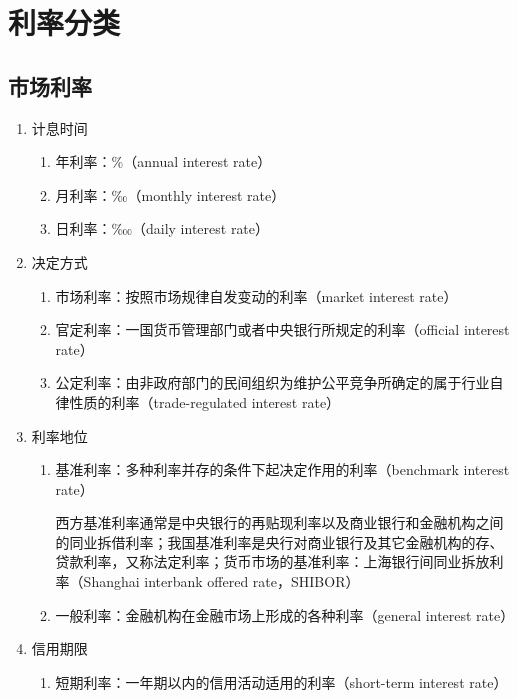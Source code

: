 \documentclass[12pt]{book}
\begin{document}
\section{利率分类}



\subsection{市场利率}


\begin{enumerate}[1.]
    \item 计息时间
          \begin{enumerate}[(1)]
              \item 年利率：\%（annual interest rate）
              \item 月利率：‰（monthly interest rate）
              \item 日利率：‱（daily interest rate）
          \end{enumerate}
    \item 决定方式
          \begin{enumerate}[(1)]
              \item 市场利率：按照市场规律自发变动的利率（market interest rate）
              \item 官定利率：一国货币管理部门或者中央银行所规定的利率（official interest rate）
              \item 公定利率：由非政府部门的民间组织为维护公平竞争所确定的属于行业自律性质的利率（trade-regulated interest rate）
          \end{enumerate}
    \item 利率地位
          \begin{enumerate}[(1)]
              \item 基准利率：多种利率并存的条件下起决定作用的利率（benchmark interest rate）
                    \par 西方基准利率通常是中央银行的再贴现利率以及商业银行和金融机构之间的同业拆借利率；我国基准利率是央行对商业银行及其它金融机构的存、贷款利率，又称法定利率；货币市场的基准利率：上海银行间同业拆放利率（Shanghai interbank offered rate，SHIBOR）
              \item 一般利率：金融机构在金融市场上形成的各种利率（general interest rate）
          \end{enumerate}
    \item 信用期限
          \begin{enumerate}[(1)]
              \item 短期利率：一年期以内的信用活动适用的利率（short-term interest rate）

\end{enumerate}
\end{enumerate}
\end{document}
